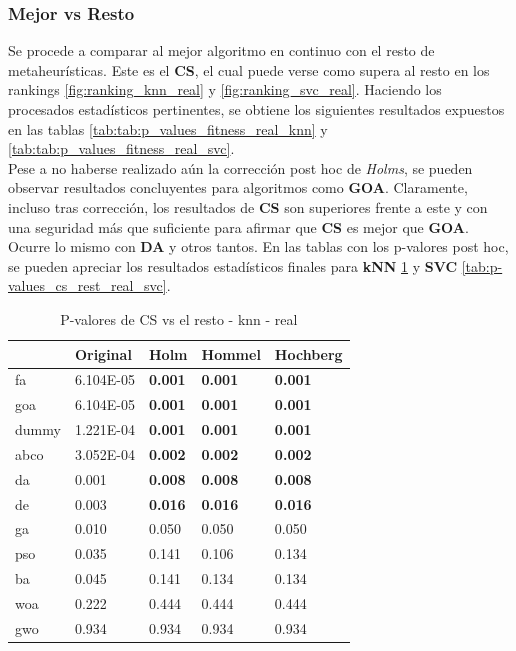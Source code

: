 \subsubsection{Mejor vs Resto}
Se procede a comparar al mejor algoritmo en continuo con el resto de metaheurísticas. Este es el \textbf{CS}, el cual puede verse como supera al resto en los rankings \ref{fig:ranking_knn_real} y \ref{fig:ranking_svc_real}. Haciendo los procesados estadísticos pertinentes, se obtiene los siguientes resultados expuestos en las tablas \ref{tab:tab:p_values_fitness_real_knn} y \ref{tab:tab:p_values_fitness_real_svc}.\\[6pt]
Pese a no haberse realizado aún la corrección post hoc de \textit{Holms}, se pueden observar resultados concluyentes para algoritmos como \textbf{GOA}. Claramente, incluso tras corrección, los resultados de \textbf{CS} son superiores frente a este y con una seguridad más que suficiente para afirmar que \textbf{CS} es mejor que \textbf{GOA}. Ocurre lo mismo con \textbf{DA} y otros tantos. En las tablas con los p-valores post hoc, se pueden apreciar los resultados estadísticos finales para \textbf{kNN} \ref{tab:p-values_cs_rest_real_knn} y \textbf{SVC} \ref{tab:p-values_cs_rest_real_svc}.

\begin{table}
    \centering
    \begin{tabular}{lllll}
        \toprule
        {}    & Original  & Holm           & Hommel         & Hochberg       \\
        \midrule
        fa    & 6.104E-05 & \textbf{0.001} & \textbf{0.001} & \textbf{0.001} \\
        goa   & 6.104E-05 & \textbf{0.001} & \textbf{0.001} & \textbf{0.001} \\
        dummy & 1.221E-04 & \textbf{0.001} & \textbf{0.001} & \textbf{0.001} \\
        abco  & 3.052E-04 & \textbf{0.002} & \textbf{0.002} & \textbf{0.002} \\
        da    & 0.001     & \textbf{0.008} & \textbf{0.008} & \textbf{0.008} \\
        de    & 0.003     & \textbf{0.016} & \textbf{0.016} & \textbf{0.016} \\
        ga    & 0.010     & 0.050          & 0.050          & 0.050          \\
        pso   & 0.035     & 0.141          & 0.106          & 0.134          \\
        ba    & 0.045     & 0.141          & 0.134          & 0.134          \\
        woa   & 0.222     & 0.444          & 0.444          & 0.444          \\
        gwo   & 0.934     & 0.934          & 0.934          & 0.934          \\
        \bottomrule
    \end{tabular}
    \caption{P-valores de CS vs el resto - knn - real}
    \label{tab:p-values_cs_rest_real_knn}
\end{table}

